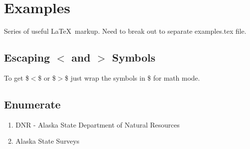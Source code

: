 
\newpage
\section{Examples}
Series of useful \LaTeX\ markup. Need to break out to 
separate examples.tex file.



\subsection{Escaping $<$ and $>$ Symbols}
To get \$$<$\$ or \$$>$\$ just wrap the symbols in \$ for math mode.

\subsection{Enumerate}
\begin{enumerate}
  \item{DNR} - Alaska State Department of Natural Resources

  \item{Alaska State Surveys}
\end{enumerate}
